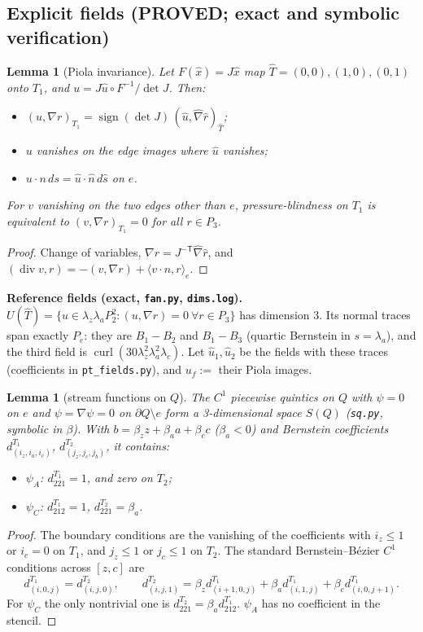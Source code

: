 \documentclass[11pt]{article}
\newtheorem{lemma}[theorem]{Lemma}
\theoremstyle{remark}
\newcommand{\ip}[2]{\langle #1,#2\rangle}
\begin{document}
\subsection{Explicit fields (PROVED; exact and symbolic verification)}
\begin{lemma}[Piola invariance]\label{lem:piola}
Let $F(\hat x)=J\hat x$ map $\hat T=(0,0),(1,0),(0,1)$ onto $T_1$, and $u=J\hat u\circ F^{-1}/\det J$. Then:
\begin{itemize}
\item $(u,\nabla r)_{T_1}=\operatorname{sign}(\det J)\,(\hat u,\hat\nabla\hat r)_{\hat T}$;
\item $u$ vanishes on the edge images where $\hat u$ vanishes;
\item $u\cdot n\,ds=\hat u\cdot\hat n\,d\hat s$ on $e$.
\end{itemize}
For $v$ vanishing on the two edges other than $e$, pressure-blindness on $T_1$ is equivalent to $(v,\nabla r)_{T_1}=0$ for all $r\in P_3$.
\end{lemma}
\begin{proof}
Change of variables, $\nabla r=J^{-\mathsf T}\hat\nabla\hat r$, and $(\operatorname{div}v,r)=-(v,\nabla r)+\ip{v\cdot n}r_e$.
\end{proof}

\noindent\textbf{Reference fields (exact, \texttt{fan.py}, \texttt{dims.log}).} $U(\hat T)=\{u\in\lambda_z\lambda_aP_2^2:(u,\nabla r)=0\ \forall r\in P_3\}$
has dimension 3. Its normal traces span exactly $P_e$: they are $B_1-B_2$ and $B_1-B_3$ (quartic Bernstein in $s=\lambda_a$), and the
third field is $\operatorname{curl}(30\lambda_z^2\lambda_a^2\lambda_c)$. Let $\hat u_1,\hat u_2$ be the fields with these traces (coefficients in
\texttt{pt\_fields.py}), and $u_f:=$ their Piola images.

\begin{lemma}[stream functions on $Q$]\label{lem:SQ}
The $C^1$ piecewise quintics on $Q$ with $\psi=0$ on $e$ and $\psi=\nabla\psi=0$ on $\partial Q\setminus e$ form a
3-dimensional space $S(Q)$ (\texttt{sq.py}, symbolic in $\beta$). With $b=\beta_zz+\beta_aa+\beta_cc$ ($\beta_a<0$) and Bernstein coefficients
$d^{T_1}_{(i_z,i_a,i_c)}$, $d^{T_2}_{(j_z,j_c,j_b)}$, it contains:
\begin{itemize}
\item $\psi_A$: $d^{T_1}_{221}=1$, and zero on $T_2$;
\item $\psi_C$: $d^{T_1}_{212}=1$, $d^{T_2}_{221}=\beta_a$.
\end{itemize}
\end{lemma}
\begin{proof}
The boundary conditions are the vanishing of the coefficients with $i_z\le1$ or $i_c=0$ on $T_1$, and $j_z\le1$ or $j_c\le1$ on $T_2$. The standard
Bernstein--B\'ezier $C^1$ conditions across $[z,c]$ are
\[
d^{T_1}_{(i,0,j)}=d^{T_2}_{(i,j,0)},\qquad d^{T_2}_{(i,j,1)}=\beta_zd^{T_1}_{(i+1,0,j)}+\beta_ad^{T_1}_{(i,1,j)}+\beta_cd^{T_1}_{(i,0,j+1)} .
\]
For $\psi_C$ the only nontrivial one is $d^{T_2}_{221}=\beta_ad^{T_1}_{212}$. $\psi_A$ has no coefficient in the stencil.
\end{proof}
\end{document}
